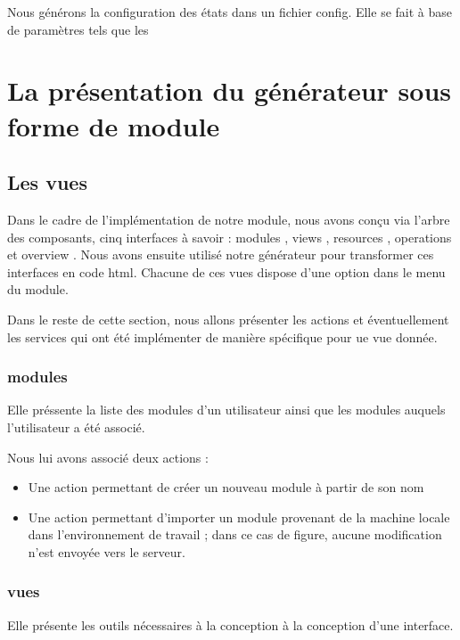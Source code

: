 \documentclass[a4paper,11pt]{report}
\begin{document}
Nous générons la configuration des états dans un fichier config. Elle se fait à base de paramètres tels que les 




\section{La présentation du générateur sous forme de module}

\subsection{Les vues}
Dans le cadre de l'implémentation de notre module, nous avons conçu via l'arbre des composants, cinq interfaces à
savoir : \og modules \fg , \og views \fg , \og resources \fg , \og operations \fg et \og overview \fg . Nous avons ensuite
utilisé notre générateur pour transformer ces interfaces en code html. Chacune de ces vues dispose d'une option dans le menu
du module.

Dans le reste de cette section, nous allons présenter les actions et éventuellement les services qui ont été implémenter de
manière spécifique pour ue vue donnée.

\subsubsection{modules}

Elle préssente la liste des modules d'un utilisateur ainsi que les modules auquels l'utilisateur a été associé.

Nous lui avons associé deux actions :

\begin{itemize}
 \item Une action permettant de créer un nouveau module à partir de son nom
 \item Une action permettant d'importer un module provenant de la machine locale dans  l'environnement de travail ;
          dans ce cas de figure, aucune modification n'est envoyée vers le serveur.
\end{itemize}

\subsubsection{ vues}

Elle présente les outils nécessaires à la conception à la conception d'une interface.
\end{document}
